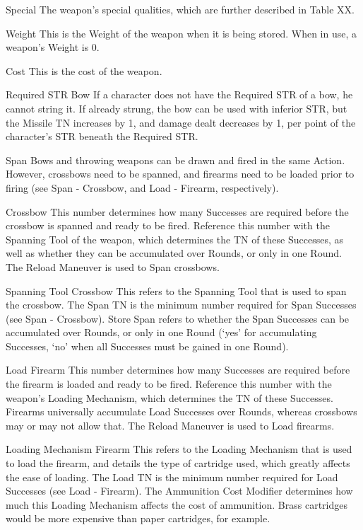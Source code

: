 \documentclass[oneside,11pt,english]{book}
\begin{document}
Special 
The weapon’s special qualities, which are further described in Table XX. 

 

Weight 
This is the Weight of the weapon when it is being stored. When in use, a weapon’s Weight is 0. 

 

Cost 
This is the cost of the weapon. 

 

Required STR 
Bow 
If a character does not have the Required STR of a bow, he cannot string it. If already strung, the bow can 
be used with inferior STR, but the Missile TN increases by 1, and damage dealt decreases by 1, per point 
of the character’s STR beneath the Required STR. 

 

Span 
Bows and throwing weapons can be drawn and fired in the same Action. However, crossbows need to be 
spanned, and firearms need to be loaded prior to firing (see Span - Crossbow, and Load - Firearm, 
respectively). 

 

Crossbow 
This number determines how many Successes are required before the crossbow is spanned and ready to 
be fired. Reference this number with the Spanning Tool of the weapon, which determines the TN of these 
Successes, as well as whether they can be accumulated over Rounds, or only in one Round. The Reload 
Maneuver is used to Span crossbows. 

 

Spanning Tool 
Crossbow 
This refers to the Spanning Tool that is used to span the crossbow. The Span TN is the minimum number 
required for Span Successes (see Span - Crossbow). Store Span refers to whether the Span Successes can 
be accumulated over Rounds, or only in one Round (‘yes’ for accumulating Successes, ‘no’ when all 
Successes must be gained in one Round). 


 

Load 
Firearm 
This number determines how many Successes are required before the firearm is loaded and ready to be 
fired. Reference this number with the weapon’s Loading Mechanism, which determines the TN of these 
Successes. Firearms universally accumulate Load Successes over Rounds, whereas crossbows may or 
may not allow that. The Reload Maneuver is used to Load firearms. 

 

Loading Mechanism 
Firearm 
This refers to the Loading Mechanism that is used to load the firearm, and details the type of cartridge 
used, which greatly affects the ease of loading. The Load TN is the minimum number required for Load 
Successes (see Load - Firearm). The Ammunition Cost Modifier determines how much this Loading 
Mechanism affects the cost of ammunition. Brass cartridges would be more expensive than paper 
cartridges, for example. 
 
\end{document}
